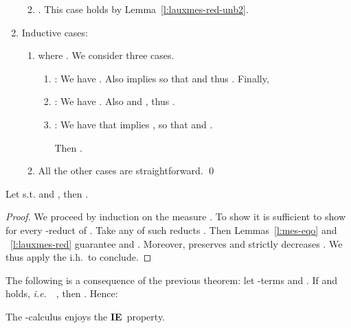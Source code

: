 \documentclass{LMCS}
\newcommand{\ie}{{\it  i.e.}~}
\renewcommand{\>}{\rightarrow}
\newcommand{\ih}{i.h.}
\newcommand{\iep}{{\bf IE}}
\newcommand{\viep}{{\bf VIE}}
\newcommand{\ignore}[1]{}
\begin{document}
\begin{enumerate}[]
\begin{enumerate}[]
\begin{enumerate}[(1)]
  \end{enumerate}

\item . This case holds by Lemma~\ref{l:lauxmes-red-unb2}.
\end{enumerate}

\item Inductive cases:
\begin{enumerate}[]
\item 
  where .  We consider three cases.
 
  \begin{enumerate}[(1)]
  \item  \emph{}: 
  We have .
  Also   implies  so that 
    and thus .
  Finally, 
  
  
\item \emph{ } : We have
  .  Also
   and
  , thus
  .
 

\item  \emph{}:   
 We have that  implies  , 
so that  and . 

Then .  

   \end{enumerate}
\ignore{
\item , where .
This case is straightforward  by the \ih\
\item , where .
This case is also straightforward  by the \ih\
\item : just use the \ih\
\item : just use the \ih }
\item All the other cases are straightforward.
\qed
\end{enumerate}
\end{enumerate}



\begin{thm}[\viep\ for ]
\label{t:ie-laux}
Let  s.t.    and 
, then . 
\end{thm}

\begin{proof}
We proceed by induction on the measure . 
To show  it is sufficient to show
 for every -reduct of .
Take any of such reducts . Then Lemmas~\ref{l:mes-eqo} and ~\ref{l:lauxmes-red}
guarantee 
 and 
. Moreover,  preserves  and 
 strictly decreases . We thus
apply the \ih\ to conclude. 
\end{proof}


The following  is a  consequence of the  previous theorem: let  -terms   and .  If  and  holds, \ie\ ,
    then . Hence:


\begin{cor}[\iep\ for ]
\label{t:ielaux}
The -calculus enjoys the \iep\ property.
\end{cor}
\end{document}
